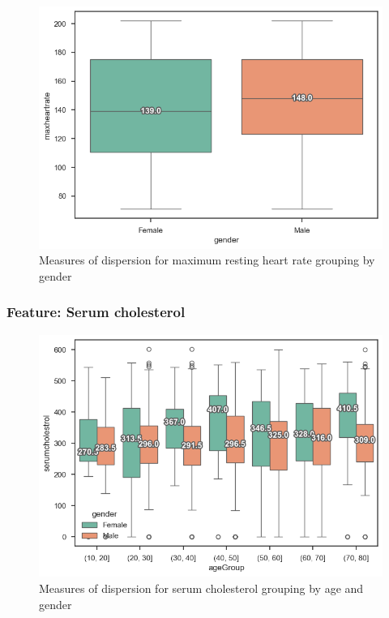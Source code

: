 \begin{figure}[H]
    \caption{Measures of dispersion for maximum resting heart rate grouping by gender}\label{boxplot-heartrate-gender}
    \centering
    \includegraphics[width=\linewidth]{media/boxplot-04-gender-heartrate.png}
\end{figure}

\subsubsection{Feature: Serum cholesterol}

\begin{figure}[H]
    \caption{Measures of dispersion for serum cholesterol grouping by age and gender}\label{boxplot-cholesterol-age}
    \centering
    \includegraphics[width=\linewidth]{media/boxplot-05-agegroup-gender-cholesterol.png}
\end{figure}

